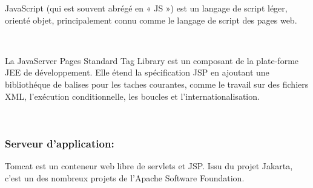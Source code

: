 \hfill
\begin{minipage}{0.75\textwidth}
	JavaScript (qui est souvent abrégé en « JS ») est un langage de script léger, orienté objet, principalement connu comme le langage de script des pages web.\\
\end{minipage}\vspace{0.5cm}\\
\begin{minipage}{0.2\textwidth}
	\begin{minipage}{\linewidth}
			\label{f3}%
	\end{minipage}
\end{minipage}
\hfill
\begin{minipage}{0.75\textwidth}
	La JavaServer Pages Standard Tag Library est un composant de la plate-forme JEE de développement. Elle étend la spécification JSP en ajoutant une bibliothéque de balises pour les taches courantes, comme le travail sur des fichiers XML, l'exécution conditionnelle, les boucles et l'internationalisation.
\end{minipage}\vspace{0.5cm}\\
\subsubsection{Serveur d’application:}
\begin{minipage}{0.2\textwidth}
	\begin{minipage}{\linewidth}
			\label{f3}%
	\end{minipage}
\end{minipage}
\hfill
\begin{minipage}{0.75\textwidth}
	Tomcat est un conteneur web libre de servlets et JSP. Issu du projet Jakarta, c'est un des nombreux projets de l’Apache Software Foundation.\\
\end{minipage}\\


